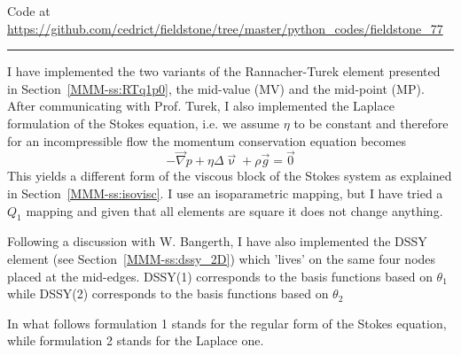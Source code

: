 

\begin{center}
Code at \url{https://github.com/cedrict/fieldstone/tree/master/python_codes/fieldstone_77}
\end{center}

\par\noindent\rule{\textwidth}{0.4pt}


I have implemented the two variants of the Rannacher-Turek element presented
in Section~\ref{MMM-ss:RTq1p0}, the mid-value (MV) and the mid-point (MP).
After communicating with Prof. Turek, I also implemented the Laplace 
formulation of the Stokes equation, i.e. we assume $\eta$ to be constant 
and therefore for an incompressible flow the momentum conservation 
equation becomes 
\[
-\vec\nabla p + \eta \Delta \vec\upnu + \rho \vec{g} = \vec{0}
\]
This yields a different form of the viscous block of the Stokes system
as explained in Section~\ref{MMM-ss:isovisc}.
I use an isoparametric mapping, but I have tried a $Q_1$ mapping and given that 
all elements are square it does not change anything. 

Following a discussion with W. Bangerth, I have also implemented the DSSY element 
(see Section~\ref{MMM-ss:dssy_2D}) which 'lives' on the same four nodes placed at 
the mid-edges. DSSY(1) corresponds to the basis functions based on $\theta_1$ 
while DSSY(2) corresponds to the basis functions based on $\theta_2$ \cite{doss99}

In what follows formulation 1 stands for the regular form of the 
Stokes equation, while formulation 2 stands for the Laplace one.

